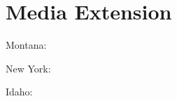 
\chapter{\label{media-extension}Media Extension}
\par Montana: \href{\#montana-flag}{}
\par New York: \href{\#newyork-flag}{}
\par Idaho: \href{\#idaho-flag}{} 